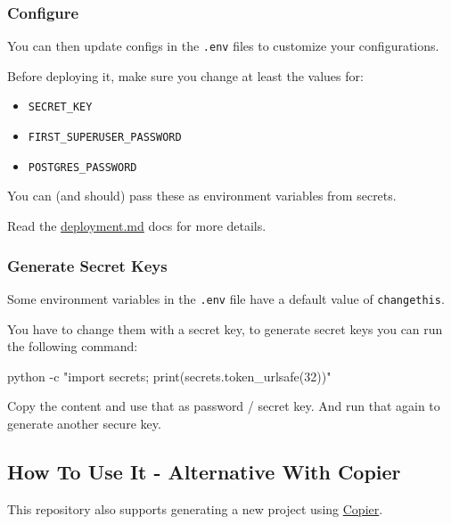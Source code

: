 \documentclass[
]{article}
\newenvironment{Shaded}{}{}
\newcommand{\AttributeTok}[1]{\textcolor[rgb]{0.49,0.56,0.16}{#1}}
\newcommand{\ExtensionTok}[1]{#1}
\newcommand{\StringTok}[1]{\textcolor[rgb]{0.25,0.44,0.63}{#1}}
\providecommand{\tightlist}{%
  \setlength{\itemsep}{0pt}\setlength{\parskip}{0pt}}
\begin{document}
\hypertarget{configure}{%
\subsubsection{Configure}\label{configure}}

You can then update configs in the \texttt{.env} files to customize your
configurations.

Before deploying it, make sure you change at least the values for:

\begin{itemize}
\tightlist
\item
  \texttt{SECRET\_KEY}
\item
  \texttt{FIRST\_SUPERUSER\_PASSWORD}
\item
  \texttt{POSTGRES\_PASSWORD}
\end{itemize}

You can (and should) pass these as environment variables from secrets.

Read the \href{./deployment.md}{deployment.md} docs for more details.

\hypertarget{generate-secret-keys}{%
\subsubsection{Generate Secret Keys}\label{generate-secret-keys}}

Some environment variables in the \texttt{.env} file have a default
value of \texttt{changethis}.

You have to change them with a secret key, to generate secret keys you
can run the following command:

\begin{Shaded}
\begin{Highlighting}[]
\ExtensionTok{python} \AttributeTok{{-}c} \StringTok{"import secrets; print(secrets.token\_urlsafe(32))"}
\end{Highlighting}
\end{Shaded}

Copy the content and use that as password / secret key. And run that
again to generate another secure key.

\hypertarget{how-to-use-it---alternative-with-copier}{%
\subsection{How To Use It - Alternative With
Copier}\label{how-to-use-it---alternative-with-copier}}

This repository also supports generating a new project using
\href{https://copier.readthedocs.io}{Copier}.
\end{document}
